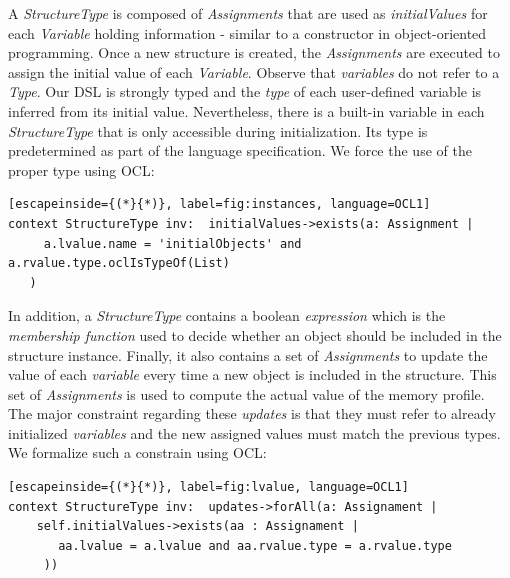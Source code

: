 A \textit{StructureType} is composed of \textit{Assignments} that are used as \textit{initialValues} for each \textit{Variable} holding information - similar to a constructor in object-oriented programming.
Once a new structure is created, the \textit{Assignments} are executed to assign the initial value of each \textit{Variable}.
Observe that \textit{variables} do not refer to a \textit{Type}.
Our DSL is strongly typed and the \textit{type} of each user-defined variable is inferred from its initial value.
Nevertheless, there is a built-in variable in each \textit{StructureType} that is only accessible during initialization.
Its type is predetermined as part of the language specification.
We force the use of the proper type using OCL:

\begin{lstlisting}[escapeinside={(*}{*)}, label=fig:instances, language=OCL1]
context StructureType inv:  initialValues->exists(a: Assignment | 
     a.lvalue.name = 'initialObjects' and a.rvalue.type.oclIsTypeOf(List)
   ) 
\end{lstlisting}

In addition, a \textit{StructureType} contains a boolean \textit{expression} which is the \textit{membership function} used to decide whether an object should be included in the structure instance.
Finally, it also contains a set of \textit{Assignments} to update the value of each \textit{variable} every time a new object is included in the structure.
This set of \textit{Assignments} is used to compute the actual value of the memory profile.
The major constraint regarding these \textit{updates} is that they must refer to already initialized \textit{variables} and the new assigned values must match the previous types.
We formalize such a constrain using OCL:

\begin{lstlisting}[escapeinside={(*}{*)}, label=fig:lvalue, language=OCL1]
context StructureType inv:  updates->forAll(a: Assignament | 
    self.initialValues->exists(aa : Assignament | 
       aa.lvalue = a.lvalue and aa.rvalue.type = a.rvalue.type
     ))
\end{lstlisting}

